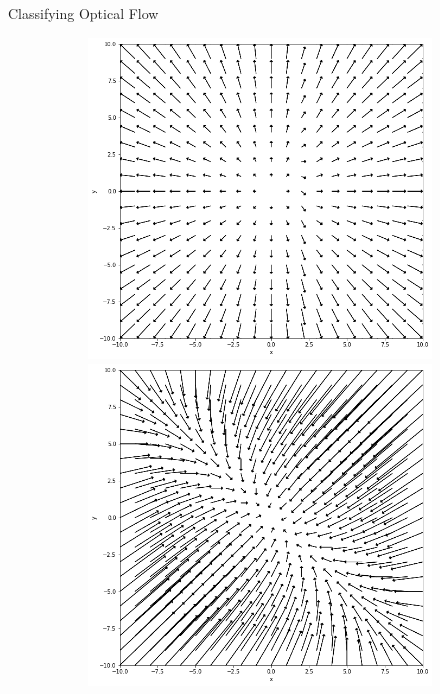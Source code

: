 \documentclass{beamer}
\begin{document}
\begin{frame}{Classifying Optical Flow}
\begin{figure}[]
     	\centering     
     	
     	

     	
     	
     	\begin{subfigure}[b]{0.8\textwidth}
     		\begin{minipage}{.3\textwidth}
     			\centering
     			\includegraphics[width= 0.8\linewidth]{images/star_phase.png}
     			
     		\end{minipage}%
     		\begin{minipage}{.3\textwidth}
     			\centering
     			\includegraphics[width=.8\linewidth]{images/nodal_phase.png}
     			

\end{minipage}
\end{subfigure}
\end{figure}
\end{frame}
\end{document}
